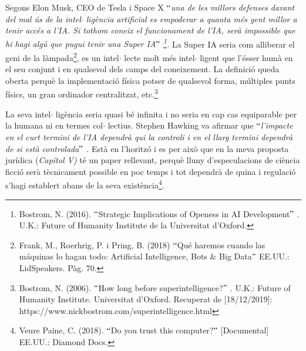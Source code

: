 \documentclass[12pt]{article}
\begin{document}
\vspace{\baselineskip}
\begin{justify}
Segons Elon Musk, CEO de Tesla i Space X \textit{$``$una de les millors defenses davant del mal ús de la intel$ \cdot $ ligència artificial es empoderar a quanta més gent millor a tenir accés a l’IA. Si tothom coneix el funcionament de l’IA, serà impossible que hi hagi algú que pugui tenir una Super IA$"$ \footnote{  Bostrom, N. (2016). $``$Strategic Implications of Openess in AI Development$"$ . U.K.: Future of Humanity Institute de la Universitat d’Oxford. }. }La Super IA seria com alliberar el geni de la làmpada\footnote{ Frank, M., Roerhrig, P. i Pring, B. (2018) $``$Qué haremos cuando las máquinas lo hagan todo: Artificial Intelligence, Bots $\&$  Big Data$"$  EE.UU.: LidSpeakers. Pàg. 70. }, es un intel$ \cdot $ lecte molt més intel$ \cdot $ ligent que l’ésser humà en el seu conjunt i en qualsevol dels camps del coneixement. La definició queda oberta perquè la implementació física potser de qualsevol forma, múltiples punts físics, un gran ordinador centralitzat, etc.\footnote{ Bostrom, N. (2006). $``$How long before superintelligence?$"$ . U.K.: Future of Humanity Institute. Universitat d’Oxford. Recuperat de [18/12/2019]: https://www.nickbostrom.com/superintelligence.html } 
\end{justify}\par


\vspace{\baselineskip}
\begin{justify}
La seva intel$ \cdot $ ligència seria quasi bé infinita i no seria en cap cas equiparable per la humana ni en termes col$ \cdot $ lectius. Stephen Hawking va afirmar que \textit{$``$l’impacte en el curt termini de l’IA dependrà qui la controli i en el llarg termini dependrà de si està controlada$"$ . }Està en l’horitzó i es per això que en la meva proposta jurídica (\textit{Capítol V)} té un paper rellevant, perquè lluny d’especulacions de ciència ficció serà tècnicament possible en poc temps i tot dependrà de quina i regulació s’hagi establert abans de la seva existència\footnote{ Veure Paine, C. (2018). $``$Do you trust this computer?$"$  [Documental] EE.UU.: Diamond Docs. }.
\end{justify}\par


\vspace{\baselineskip}

\vspace{\baselineskip}
\end{document}
